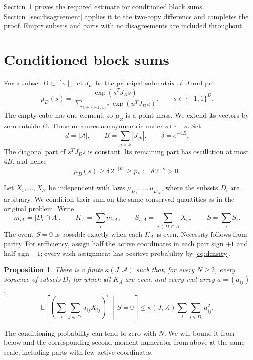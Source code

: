 \documentclass[11pt]{article}
\newtheorem{proposition}[theorem]{Proposition}
\begin{document}
Section~\ref{sec:blocks} proves the required estimate for conditioned block
sums. Section~\ref{sec:disagreement} applies it to the two-copy difference
and completes the proof. Empty subsets and parts with no disagreements are
included throughout.
\section{Conditioned block sums}\label{sec:blocks}
For a subset $D\subset[n]$, let $J_D$ be the principal submatrix of $J$ and
put
\begin{equation}\label{eq:masklaw}
 \mu_D(s)=\frac{\exp(s^T J_D s)}
 {\sum_{u\in\{-1,1\}^D}\exp(u^T J_D u)},
 \qquad s\in\{-1,1\}^D.
\end{equation}
The empty cube has one element, so $\mu_\varnothing$ is a point mass.
We extend its vectors by zero outside $D$. These measures are symmetric under
$s\mapsto-s$. Set
\begin{equation}\label{eq:delta}
 d=|\mathcal A|,\qquad B=\sum_{j<k}|J_{jk}|,\qquad \delta=e^{-4B}.
\end{equation}
The diagonal part of $s^T J_Ds$ is constant. Its remaining part has
oscillation at most $4B$, and hence
\begin{equation}\label{eq:density}
 \mu_D(s)\geq\delta\,2^{-|D|}\geq p_*:=\delta\,2^{-n}>0.
\end{equation}

Let $X_1,\ldots,X_N$ be independent with laws $\mu_{D_1},\ldots,\mu_{D_N}$,
where the subsets $D_i$ are arbitrary. We condition their sum on the same
conserved quantities as in the original problem. Write
\[
 m_{iA}=|D_i\cap A|,\qquad K_A=\sum_i m_{iA},\qquad
 S_{i,A}=\sum_{j\in D_i\cap A}X_{ij},\qquad S=\sum_i S_i.
\]
The event $S=0$ is possible exactly when each $K_A$ is even. Necessity follows
from parity. For sufficiency, assign half the active coordinates in each part
sign $+1$ and half sign $-1$; every such assignment has positive probability
by \eqref{eq:density}.

\begin{proposition}\label{prop:moment}
There is a finite $\kappa(J,\mathcal A)$ such that, for every $N\geq2$, every
sequence of subsets $D_i$ for which all $K_A$ are even, and every real array
$a=(a_{ij})$,
\begin{equation}\label{eq:moment}
 \mathbb E\left[\left(\sum_i\sum_{j\in D_i}a_{ij}X_{ij}\right)^2
       \,\middle|\, S=0\right]
 \leq \kappa(J,\mathcal A)\sum_i\sum_{j\in D_i}a_{ij}^2.
\end{equation}
\end{proposition}
The conditioning probability can tend to zero with $N$. We will bound it
from below and the corresponding second-moment numerator from above at the
same scale, including parts with few active coordinates.
\end{document}
